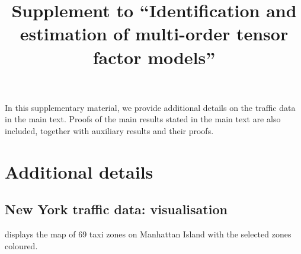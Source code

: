 \documentclass[aos]{imsart}
\theoremstyle{plain}
\theoremstyle{definition}
\begin{document}






\clearpage
\setcounter{section}{0}
\setcounter{equation}{0}
\renewcommand{\thesection}{S.\arabic{section}}
\renewcommand{\theHsection}{S.\arabic{section}} 
\renewcommand{\thesubsection}{S\arabic{section}.\arabic{subsection}}
\renewcommand{\theHsubsection}{S\arabic{section}.\arabic{subsection}} 

\def\theequation{S.\arabic{equation}}
\def\thelemma{S.\arabic{lemma}}
\def\theremark{S.\arabic{remark}}


\setcounter{page}{1}

\title{Supplement to ``Identification and estimation of multi-order tensor factor models''}
\vspace{12pt}


In this supplementary material, we provide additional details on the traffic data in the main text.
Proofs of the main results stated in the main text are also included, together with auxiliary results and their proofs.

\section{Additional details}







\subsection{New York traffic data: visualisation}

 displays the map of 69 taxi zones on Manhattan Island with the selected zones coloured.
\end{document}
